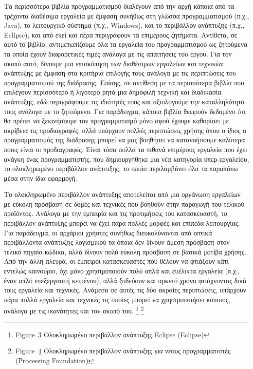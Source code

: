 \documentclass[
]{article}
\begin{document}
Τα περισσότερα βιβλία προγραμματισμού διαλέγουν από την αρχή κάποια από
τα τρέχοντα διαθέσιμα εργαλεία με έμφαση συνήθως στη γλώσσα
προγραμματισμού (π.χ., Java), το λειτουργικό σύστημα (π.χ., Windows),
και το περιβάλλον ανάπτυξης (π.χ., Eclipse), και από εκεί και πέρα
περιγράφουν τα επιμέρους ζητήματα. Αντίθετα, σε αυτό το βιβλίο,
αντιμετωπίζουμε όλα τα εργαλεία του προγραμματισμού ως ζητούμενα τα
οποία έχουν διαφορετικές τιμές ανάλογα με τις απαιτήσεις του έργου. Για
τον σκοπό αυτό, δίνουμε μια επισκόπηση των διαθέσιμων εργαλείων και
τεχνικών ανάπτυξης με έμφαση στα κριτήρια επιλογής τους ανάλογα με τις
περιπτώσεις του προγραμματισμού της διάδρασης. Επίσης, σε αντίθεση με τα
περισσότερα βιβλία που επιλέγουν περισσότερο ή λιγότερο ρητά μια
δημοφιλή τεχνική και διαδικασία ανάπτυξης, εδώ περιγράφουμε τις
ιδιότητές τους και αξιολογούμε την καταλληλότητά τους ανάλογα με το
ζητούμενο. Για παράδειγμα, κάποια βιβλία θεωρούν δεδομένο ότι θα πρέπει
να ξεκινήσουμε τον προγραμματισμό μόνο αφού έχουμε καθορίσει με ακρίβεια
τις προδιαγραφές, αλλά υπάρχουν πολλές περιπτώσεις χρήσης όπου ο ίδιος ο
προγραμματισμός της διάδρασης μπορεί να μας βοηθήσει να κατανοήσουμε
καλύτερα ποιες είναι οι προδιαγραφές. Είναι τόσα πολλά τα πιθανά
επιμέρους εργαλεία που έχει ανάγκη ένας προγραμματιστής, που
δημιουργήθηκε μια νέα κατηγορία υπερ-εργαλείου, το ολοκληρωμένο
περιβάλλον ανάπτυξης, το οποίο περιλαμβάνει όλα τα παραπάνω μέσα στην
ίδια εφαρμογή.

Το ολοκληρωμένο περιβάλλον ανάπτυξης αποτελείται από μια οργάνωση
εργαλείων με εύκολη πρόσβαση σε δομές και τεχνικές που βοηθούν στην
παραγωγή του τελικού προϊόντος. Ανάλογα με την εμπειρία και τις
προτιμήσεις του κατασκευαστή, το περιβάλλον ανάπτυξης μπορεί να έχει
πάρα πολλές μορφές και επίπεδα λειτουργίας. Για παράδειγμα, οι αρχάριοι
χρήστες συνήθως διευκολύνονται από οπτικά περιβάλλοντα ανάπτυξης
λογισμικού τα όποια δεν δίνουν άμεση πρόσβαση στον τελικό πηγαίο κώδικα,
αλλά δίνουν πολύ εύκολη πρόσβαση σε βασικά μοτίβα χρήσης. Από την άλλη
πλευρά, οι έμπειροι κατασκευαστές που θέλουν να φτιάξουν κάτι εντελώς
καινούριο, όχι μόνο χρησιμοποιούν πολύ απλά και ευέλικτα εργαλεία (π.χ.,
έναν απλό επεξεργαστή κειμένου), αλλά ξοδεύουν και αρκετό χρόνο
φτιάχνοντας δικά τους εργαλεία και τεχνικές. Ανάμεσα σε αυτές τις δύο
ακραίες περιπτώσεις, υπάρχουν πάρα πολλά εργαλεία και τεχνικές τις
οποίες μπορεί να χρησιμοποιήσει κάποιος, ανάλογα με τις ικανότητες και
τον σκοπό του. \footnote{Figure~\protect\hyperlink{fig:eclipse-ide}{3}
  Ολοκληρωμένο περιβάλλον ανάπτυξης Eclipse (Eclipse)} \footnote{Figure~\protect\hyperlink{fig:processing-ide}{4}
  Ολοκληρωμένο περιβάλλον ανάπτυξης για νέους προγραμματιστές
  (Processing Foundation)}
\end{document}
